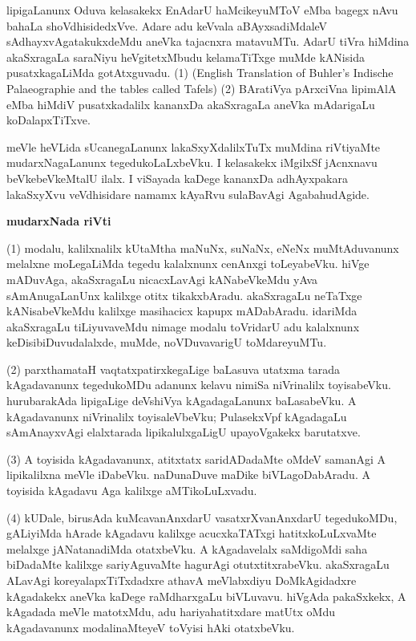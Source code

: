 \documentclass[11pt,a4size]{article}
\begin{document}
lipigaLanunx Oduva kelasakekx EnAdarU haMcikeyuMToV eMba bagegx nAvu
bahaLa shoVdhisidedxVve. Adare adu keVvala aBAyxsadiMdaleV
sAdhayxvAgatakukxdeMdu aneVka tajacnxra matavuMTu. AdarU tiVra hiMdina
akaSxragaLa saraNiyu heVgitetxMbudu kelamaTiTxge muMde kANisida
pusatxkagaLiMda gotAtxguvadu. (1) {\rm (English
    Translation of Buhler's Indische Palaeographie and the tables
    called Tafels)} (2) BAratiVya pArxciVna lipimAlA eMba hiMdiV
pusatxkadalilx kananxDa akaSxragaLa aneVka mAdarigaLu koDalapxTiTxve.

meVle heVLida sUcanegaLanunx lakaSxyXdalilxTuTx muMdina riVtiyaMte
mudarxNagaLanunx tegedukoLaLxbeVku. I kelasakekx iMgilxSf jAcnxnavu
beVkebeVkeMtalU ilalx. I viSayada kaDege kananxDa adhAyxpakara
lakaSxyXvu veVdhisidare namamx kAyaRvu sulaBavAgi AgabahudAgide.

\bigskip
\centerline{\textbf{\LARGE mudarxNada riVti}}
\medskip

(1) modalu, kalilxnalilx kUtaMtha maNuNx, suNaNx, eNeNx muMtAduvanunx
    melalxne moLegaLiMda tegedu kalalxnunx cenAnxgi toLeyabeVku. hiVge
    mADuvAga, akaSxragaLu nicacxLavAgi kANabeVkeMdu yAva
    sAmAnugaLanUnx kalilxge otitx tikakxbAradu. akaSxragaLu neTaTxge
    kANisabeVkeMdu kalilxge masihacicx kapupx mADabAradu. idariMda
    akaSxragaLu tiLiyuvaveMdu nimage modalu toVridarU adu kalalxnunx
    keDisibiDuvudalalxde, muMde, noVDuvavarigU toMdareyuMTu.

(2) parxthamataH vaqtatxpatirxkegaLige baLasuva utatxma tarada
    kAgadavanunx tegedukoMDu adanunx kelavu nimiSa niVrinalilx
    toyisabeVku. hurubarakAda lipigaLige deVshiVya kAgadagaLanunx
    baLasabeVku. A kAgadavanunx niVrinalilx toyisaleVbeVku;
    PulasekxVpf kAgadagaLu sAmAnayxvAgi elalxtarada lipikalulxgaLigU
    upayoVgakekx barutatxve.

(3) A toyisida kAgadavanunx, atitxtatx saridADadaMte oMdeV samanAgi A
    lipikalilxna meVle iDabeVku. naDunaDuve maDike biVLagoDabAradu. A
    toyisida kAgadavu Aga kalilxge aMTikoLuLxvadu.

(4) kUDale, birusAda kuMcavanAnxdarU vasatxrXvanAnxdarU tegedukoMDu,
    gALiyiMda hArade kAgadavu kalilxge acucxkaTATxgi hatitxkoLuLxvaMte
    melalxge jANatanadiMda otatxbeVku. A kAgadavelalx saMdigoMdi saha
    biDadaMte kalilxge sariyAguvaMte hagurAgi
    otutxtitxrabeVku. akaSxragaLu ALavAgi koreyalapxTiTxdadxre athavA
    meVlabxdiyu DoMkAgidadxre kAgadakekx aneVka kaDege raMdharxgaLu
    biVLuvavu. hiVgAda pakaSxkekx, A kAgadada meVle matotxMdu, adu
    hariyahatitxdare matUtx oMdu kAgadavanunx modalinaMteyeV toVyisi
    hAki otatxbeVku.
\end{document}
